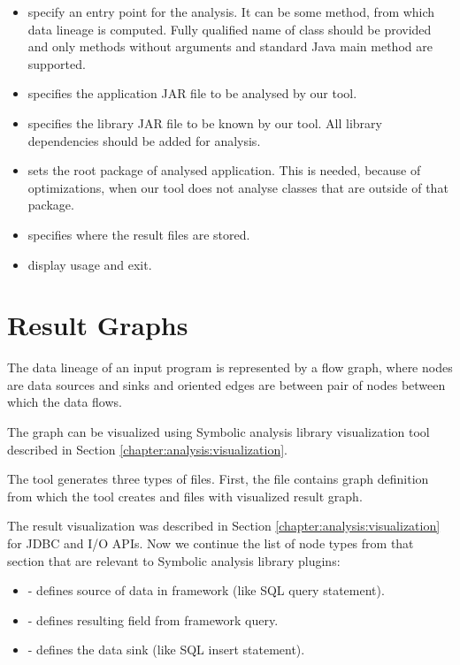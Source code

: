 \begin{itemize}
  \item {} specify an entry point for the analysis.
    It can be some method, from which data lineage is computed.
    Fully qualified name of class should be provided and only methods
    without arguments and standard Java main method are supported.
  \item {} specifies the application JAR file
    to be analysed by our \ToolName tool.
  \item {} specifies the library JAR file
    to be known by our \ToolName tool.
    All library dependencies should be added for analysis.
  \item {} sets the root package of analysed application.
    This is needed, because of optimizations, when our \ToolName tool
    does not analyse classes that are outside of that package.
  \item {} specifies where the result files are stored.
  \item {} display usage and exit.
\end{itemize}




\section{Result Graphs \label{chapter:program:graphs}}

The data lineage of an input program is represented by a flow graph,
where nodes are data sources and sinks and oriented edges are between
pair of nodes between which the data flows.

The graph can be visualized using Symbolic analysis library visualization tool
described in Section \ref{chapter:analysis:visualization}.

The \ToolName tool generates three types of files. First, the  file contains graph definition
from which the  tool creates  and  files with visualized result graph.

The result visualization was described in Section \ref{chapter:analysis:visualization}
for JDBC and I/O APIs.
Now we continue the list of node types from that section
that are relevant to Symbolic analysis library plugins:
\begin{itemize}
  \item {} - defines source of data in framework (like SQL query statement).
  \item {} - defines resulting field from framework query.
  \item {} - defines the data sink (like SQL insert statement).
\end{itemize}

